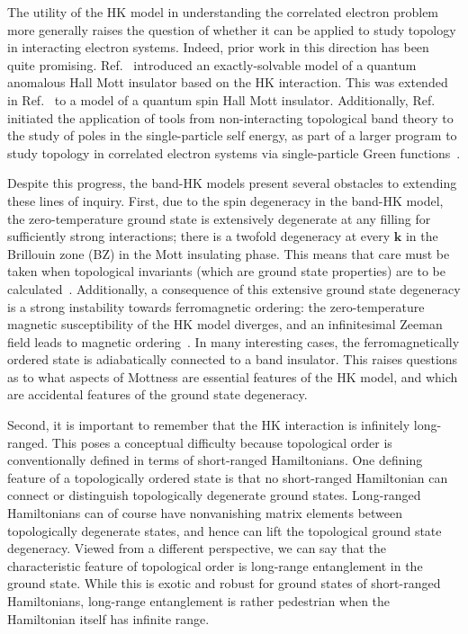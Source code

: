 \documentclass[prb,aps,amssymb,twocolumn,notitlepage]{revtex4-2}
\begin{document}
The utility of the HK model in understanding the correlated electron problem more generally raises the question of whether it can be applied to study topology in interacting electron systems. 
Indeed, prior work in this direction has been quite promising. 
Ref.~\cite{mai2023topological} introduced an exactly-solvable model of a quantum anomalous Hall Mott insulator based on the HK interaction. 
This was extended in Ref.~\cite{2022PhilipSpinHallHK} to a model of a quantum spin Hall Mott insulator. 
Additionally, Ref.~\cite{setty2023symmetry} initiated the application of tools from non-interacting topological band theory to the study of poles in the single-particle self energy, as part of a larger program to study topology in correlated electron systems via single-particle Green functions~\cite{wagner2023mott}.

Despite this progress, the band-HK models present several obstacles to extending these lines of inquiry. 
First, due to the spin degeneracy in the band-HK model, the zero-temperature ground state is extensively degenerate at any filling for sufficiently strong interactions; there is a twofold degeneracy at every $\mathbf{k}$ in the Brillouin zone (BZ) in the Mott insulating phase. 
This means that care must be taken when topological invariants (which are ground state properties) are to be calculated~\cite{zhao2023failure,yanghk2019}. 
Additionally, a consequence of this extensive ground state degeneracy is a strong instability towards ferromagnetic ordering: the zero-temperature magnetic susceptibility of the HK model diverges, and an infinitesimal Zeeman field leads to magnetic ordering~\cite{yang2021exactly}. 
In many interesting cases, the ferromagnetically ordered state is adiabatically connected to a band insulator. 
This raises questions as to what aspects of Mottness are essential features of the HK model, and which are accidental features of the ground state degeneracy.

Second, it is important to remember that the HK interaction is infinitely long-ranged. 
This poses a conceptual difficulty because topological order is conventionally defined in terms of short-ranged Hamiltonians. 
One defining feature of a topologically ordered state is that no short-ranged Hamiltonian can connect or distinguish topologically degenerate ground states. 
Long-ranged Hamiltonians can of course have nonvanishing matrix elements between topologically degenerate states, and hence can lift the topological ground state degeneracy. 
Viewed from a different perspective, we can say that the characteristic feature of topological order is long-range entanglement in the ground state. 
While this is exotic and robust for ground states of short-ranged Hamiltonians, long-range entanglement is rather pedestrian when the Hamiltonian itself has infinite range.
\end{document}

